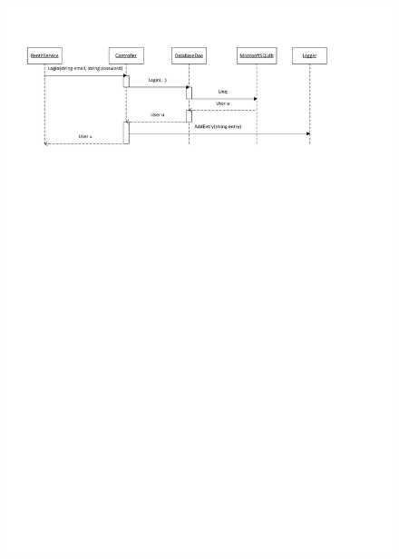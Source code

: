 \documentclass[a4paper,11pt,report]{article}
\begin{document}
\begin{figure}[htp]
\centering
\includegraphics[width=17cm,keepaspectratio=true]{./LoginSD.pdf}
\end{figure}
\end{document}
